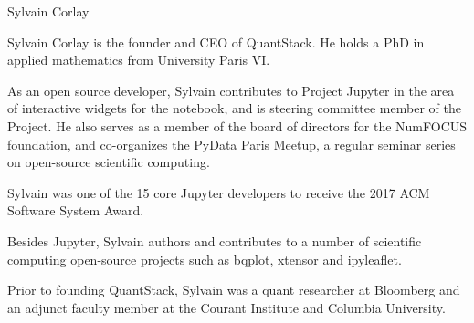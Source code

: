 \begin{participant}[type=leadPI,PM=6,gender=male]{Sylvain Corlay}

  Sylvain Corlay is the founder and CEO of QuantStack. He holds a PhD in applied mathematics from University Paris VI.

  As an open source developer, Sylvain contributes to Project Jupyter in the area of interactive widgets for the notebook, and is steering committee member of the Project. He also serves as a member of the board of directors for the NumFOCUS foundation, and co-organizes the PyData Paris Meetup, a regular seminar series on open-source scientific computing.

  Sylvain was one of the 15 core Jupyter developers to receive the 2017 ACM Software System Award.

  Besides Jupyter, Sylvain authors and contributes to a number of scientific computing open-source projects such as bqplot, xtensor and ipyleaflet.

  Prior to founding QuantStack, Sylvain was a quant researcher at Bloomberg and an adjunct faculty member at the Courant Institute and Columbia University.
\end{participant}

